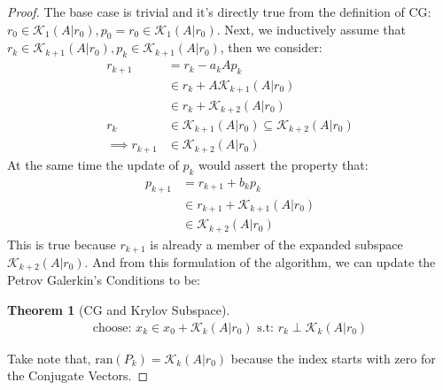 \documentclass[]{article}
\theoremstyle{definition}
\newtheorem{theorem}{Theorem}            %
\begin{document}
            \begin{proof}
                The base case is trivial and it's directly true from the definition of CG: $r_0 \in \mathcal K_1(A|r_0), p_0 = r_0 \in \mathcal K_1(A|r_0)$. Next, we inductively assume that $r_k \in \mathcal K_{k + 1}(A|r_0), p_k \in \mathcal K_{k + 1}(A|r_0)$, then we consider: 
                \begin{align}
                    r_{k + 1} &= r_k - a_kAp_k
                    \\
                    &\in r_k + A\mathcal K_{k + 1}(A|r_0)
                    \\
                    &\in r_k + \mathcal K_{k + 2}(A|r_0)
                    \\
                    r_k 
                    &\in 
                    \mathcal K_{k + 1}(A|r_0) \subseteq \mathcal K_{k + 2}(A|r_0)
                    \\
                    \implies r_{k + 1}
                    &\in 
                    \mathcal K_{k + 2}(A|r_0)
                \end{align}
                At the same time the update of $p_k$ would assert the property that: 
                \begin{align}
                    p_{k + 1} &= r_{k + 1} + b_kp_k
                    \\
                    &\in 
                    r_{k + 1} + \mathcal K_{k + 1}(A|r_0)
                    \\
                    &\in \mathcal K_{k + 2}(A|r_0)
                \end{align}
                This is true because $r_{k + 1}$ is already a member of the expanded subspace $\mathcal K_{k + 2}(A|r_0)$. And from this formulation of the algorithm, we can update the Petrov Galerkin's Conditions to be: 
                \begin{theorem}[CG and Krylov Subspace]\label{theorem:CG_and_Krylov_Subspace}
                    \begin{align}
                        \text{choose: } x_k\in x_0 + \mathcal K_{k}(A|r_0) \text{ s.t: } r_k \perp \mathcal K_{k}(A|r_0)
                    \end{align}    
                \end{theorem}
                Take note that, $\text{ran}(P_k) = \mathcal K_k(A|r_0)$ because the index starts with zero for the Conjugate Vectors.
            \end{proof}
\end{document}
